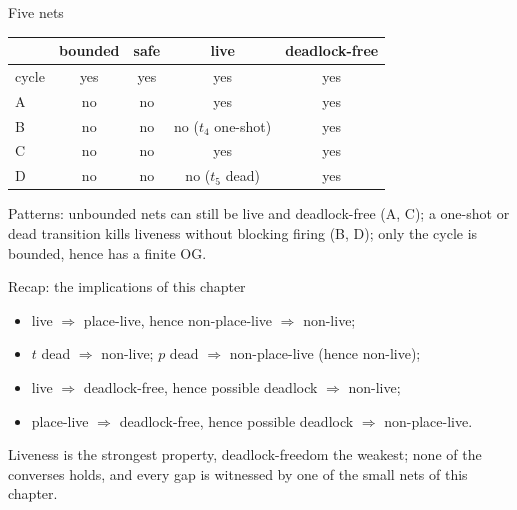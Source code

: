 \begin{examplebox}{Five nets}
\begin{center}
\small
\begin{tabular}{lcccc}
\toprule
 & \textbf{bounded} & \textbf{safe} & \textbf{live} & \textbf{deadlock-free} \\
\midrule
cycle & yes & yes & yes & yes \\
A & no & no & yes & yes \\
B & no & no & no ($t_4$ one-shot) & yes \\
C & no & no & yes & yes \\
D & no & no & no ($t_5$ dead) & yes \\
\bottomrule
\end{tabular}
\end{center}
Patterns: unbounded nets can still be live and deadlock-free (A, C); a one-shot or dead transition kills liveness without blocking firing (B, D); only the cycle is bounded, hence has a finite OG.
\end{examplebox}

\begin{notebox}{Recap: the implications of this chapter}
\begin{itemize}
  \item live $\Rightarrow$ place-live, hence non-place-live $\Rightarrow$ non-live;
  \item $t$ dead $\Rightarrow$ non-live; $p$ dead $\Rightarrow$ non-place-live (hence non-live);
  \item live $\Rightarrow$ deadlock-free, hence possible deadlock $\Rightarrow$ non-live;
  \item place-live $\Rightarrow$ deadlock-free, hence possible deadlock $\Rightarrow$ non-place-live.
\end{itemize}
Liveness is the strongest property, deadlock-freedom the weakest; none of the converses holds, and every gap is witnessed by one of the small nets of this chapter.
\end{notebox}
